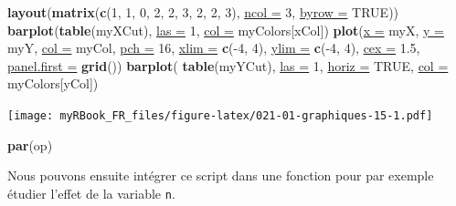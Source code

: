\documentclass[twoside,symmetric]{book}
\newenvironment{Shaded}{}{}
\newcommand{\DataTypeTok}[1]{\underline{#1}}
\newcommand{\DecValTok}[1]{#1}
\newcommand{\FloatTok}[1]{#1}
\newcommand{\KeywordTok}[1]{\textbf{#1}}
\newcommand{\NormalTok}[1]{#1}
\newcommand{\OperatorTok}[1]{#1}
\newcommand{\OtherTok}[1]{#1}
\begin{document}
\begin{Shaded}
\begin{Highlighting}[]
\KeywordTok{layout}\NormalTok{(}\KeywordTok{matrix}\NormalTok{(}\KeywordTok{c}\NormalTok{(}\DecValTok{1}\NormalTok{, }\DecValTok{1}\NormalTok{, }\DecValTok{0}\NormalTok{, }
                \DecValTok{2}\NormalTok{, }\DecValTok{2}\NormalTok{, }\DecValTok{3}\NormalTok{, }
                \DecValTok{2}\NormalTok{, }\DecValTok{2}\NormalTok{, }\DecValTok{3}\NormalTok{), }\DataTypeTok{ncol =} \DecValTok{3}\NormalTok{, }\DataTypeTok{byrow =} \OtherTok{TRUE}\NormalTok{))}
\KeywordTok{barplot}\NormalTok{(}\KeywordTok{table}\NormalTok{(myXCut), }\DataTypeTok{las =} \DecValTok{1}\NormalTok{, }\DataTypeTok{col =}\NormalTok{ myColors[xCol])}
\KeywordTok{plot}\NormalTok{(}\DataTypeTok{x =}\NormalTok{ myX, }\DataTypeTok{y =}\NormalTok{ myY, }\DataTypeTok{col =}\NormalTok{ myCol, }\DataTypeTok{pch =} \DecValTok{16}\NormalTok{, }
  \DataTypeTok{xlim =} \KeywordTok{c}\NormalTok{(}\OperatorTok{-}\DecValTok{4}\NormalTok{, }\DecValTok{4}\NormalTok{), }\DataTypeTok{ylim =} \KeywordTok{c}\NormalTok{(}\OperatorTok{-}\DecValTok{4}\NormalTok{, }\DecValTok{4}\NormalTok{), }\DataTypeTok{cex =} \FloatTok{1.5}\NormalTok{, }
  \DataTypeTok{panel.first =} \KeywordTok{grid}\NormalTok{())}
\KeywordTok{barplot}\NormalTok{(}
  \KeywordTok{table}\NormalTok{(myYCut), }
  \DataTypeTok{las =} \DecValTok{1}\NormalTok{, }
  \DataTypeTok{horiz =} \OtherTok{TRUE}\NormalTok{, }
  \DataTypeTok{col =}\NormalTok{ myColors[yCol])}
\end{Highlighting}
\end{Shaded}

\texttt{[image: myRBook\_FR\_files/figure-latex/021-01-graphiques-15-1.pdf]}

\begin{Shaded}
\begin{Highlighting}[]
\KeywordTok{par}\NormalTok{(op)}
\end{Highlighting}
\end{Shaded}

Nous pouvons ensuite intégrer ce script dans une fonction pour par exemple étudier l'effet de la variable \texttt{n}.
\end{document}
